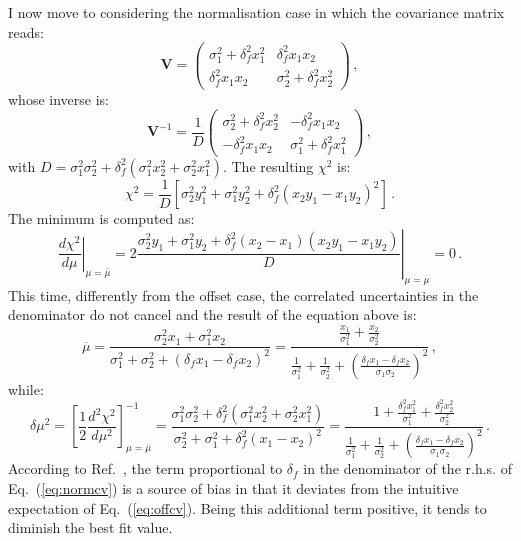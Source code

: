 \documentclass[10pt,a4paper]{article}
\begin{document}
I now move to considering the normalisation case in which the
covariance matrix reads:
\begin{equation}
\mathbf{V}=
\begin{pmatrix}
\sigma_1^2+\delta_f^2x_1^2& \delta_f^2x_1x_2\\
\delta_f^2x_1x_2& \sigma_2^2+\delta_f^2x_2^2
\end{pmatrix}\,,
\end{equation}
whose inverse is:
\begin{equation}
\mathbf{V}^{-1}=\frac{1}{D}
\begin{pmatrix}
\sigma_2^2+\delta_f^2x_2^2& -\delta_f^2x_1x_2\\
-\delta_f^2x_1x_2& \sigma_1^2+\delta_f^2x_1^2
\end{pmatrix}\,,
\end{equation}
with
$D=\sigma_1^2\sigma_2^2+\delta_f^2(\sigma_1^2x_2^2+\sigma_2^2x_1^2)$. The
resulting $\chi^2$ is:
\begin{equation}
\chi^2=\frac{1}{D}\left[\sigma_2^2y_1^2+ \sigma_1^2y_2^2+\delta_f^2(x_2y_1 -x_1y_2)^2\right]\,.
\end{equation}
The minimum is computed as:
\begin{equation}
  \left.\frac{d\chi^2}{d\mu}\right|_{\mu=\overline{\mu}} = \left.2\frac{\sigma_2^2y_1+ \sigma_1^2y_2+\delta_f^2(x_2 -x_1)(x_2y_1 -x_1y_2)}{D}\right|_{\mu=\overline{\mu}}=0\,.
\end{equation}
This time, differently from the offset case, the correlated
uncertainties in the denominator do not cancel and the result of the
equation above is:
\begin{equation}\label{eq:normcv}
\overline{\mu} = \frac{\sigma_2^2x_1+\sigma_1^2x_2}{\sigma_1^2+\sigma_2^2+(\delta_f x_1-\delta_f x_2)^2}=\frac{\frac{x_1}{\sigma_1^2}+\frac{x_2}{\sigma_2^2}}{\frac{1}{\sigma_1^2}+\frac{1}{\sigma_2^2}+\left(\frac{\delta_f x_1-\delta_f x_2}{\sigma_1\sigma_2}\right)^2}\,,
\end{equation}
while:
\begin{equation}\label{eq:normcvunc}
  \delta\mu^2 = \left[\frac12\frac{d^2\chi^2}{d\mu^2}\right]_{\mu=\overline{\mu}}^{-1} = \frac{\sigma_1^2\sigma_2^2+\delta_f^2(\sigma_1^2x_2^2+\sigma_2^2x_1^2)}{\sigma_2^2+ \sigma_1^2+\delta_f^2(x_1 -x_2)^2}=\frac{1+\frac{\delta_f^2 x_1^2}{\sigma_1^2}+\frac{\delta_f^2 x_2^2}{\sigma_2^2}}{\frac{1}{\sigma_1^2}+ \frac{1}{\sigma_2^2}+\left(\frac{\delta_f x_1 -\delta_f x_2}{\sigma_1\sigma_2}\right)^2}\,.
\end{equation}
According to Ref.~\cite{DAgostini:1993arp}, the term proportional to
$\delta_f$ in the denominator of the r.h.s. of Eq.~(\ref{eq:normcv})
is a source of bias in that it deviates from the intuitive expectation
of Eq.~(\ref{eq:offcv}). Being this additional term positive, it tends
to diminish the best fit value.
\end{document}
